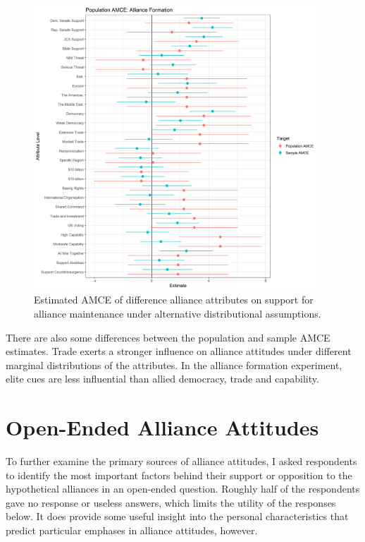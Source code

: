 \documentclass[12pt]{article}
\begin{document}
\begin{figure}
	\centering
		\includegraphics[width=0.95\textwidth]{pop-amce-form.png}
	\caption{Estimated AMCE of difference alliance attributes on support for alliance maintenance under alternative distributional assumptions.}
	\label{fig:pop-amce-form}
\end{figure}

There are also some differences between the population and sample AMCE estimates. 
Trade exerts a stronger influence on alliance attitudes under different marginal distributions of the attributes. 
In the alliance formation experiment, elite cues are less influential than allied democracy, trade and capability. 


\section{Open-Ended Alliance Attitudes} 


To further examine the primary sources of alliance attitudes, I asked respondents to identify the most important factors behind their support or opposition to the hypothetical alliances in an open-ended question. 
Roughly half of the respondents gave no response or useless answers, which limits the utility of the responses below. 
It does provide some useful insight into the personal characteristics that predict particular emphases in alliance attitudes, however. 
\end{document}
